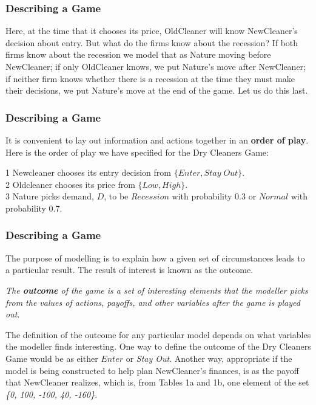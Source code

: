  \begin{frame}[fragile]\frametitle{Describing a Game}
  Here,  at the time that it chooses its price,  OldCleaner will know
NewCleaner's decision about entry.  But what do the firms know about the
recession?  If both firms know about the recession we model that as Nature
moving before NewCleaner; if  only OldCleaner knows, we put Nature's move after
NewCleaner; if neither firm knows whether there is a recession at the time they
must make their decisions, we put Nature's move at the end of the game.  Let us
do this last.
\end{frame}



 \begin{frame}[fragile]\frametitle{Describing a Game}
       It is convenient to lay out information and actions together in an {\bf
order of play}.  Here is the  order of play we have specified for the Dry
Cleaners Game:

  1   Newcleaner chooses its entry decision from $  \{ Enter,  Stay \;
Out\}$.\\  2  Oldcleaner chooses its  price   from $  \{ Low,   High\}
$.  \\  3  Nature picks demand, $D$, to be $Recession$ with probability
0.3 or $Normal$ with probability 0.7.\\
\end{frame}

 \begin{frame}[fragile]\frametitle{Describing a Game}
   The purpose of modelling is to explain how  a given set of circumstances
leads to a particular result. The  result of interest is known as the outcome.

 {\it The {\bf outcome} of the game is a set of interesting elements
that the modeller picks from the values of actions, payoffs, and other variables
after the game is played out.}

   The definition of the outcome for any particular model depends on what
variables   the modeller finds interesting. One way to define the outcome of the
Dry Cleaners Game would be as either $Enter$ or {\it Stay Out}.  Another way,
appropriate if the model is being constructed to help plan  NewCleaner's
finances, is as the payoff that NewCleaner realizes, which is, from Tables 1a
and 1b,  one element of the set {\it \{0, 100, -100,  40, -160\}}.
\end{frame}

